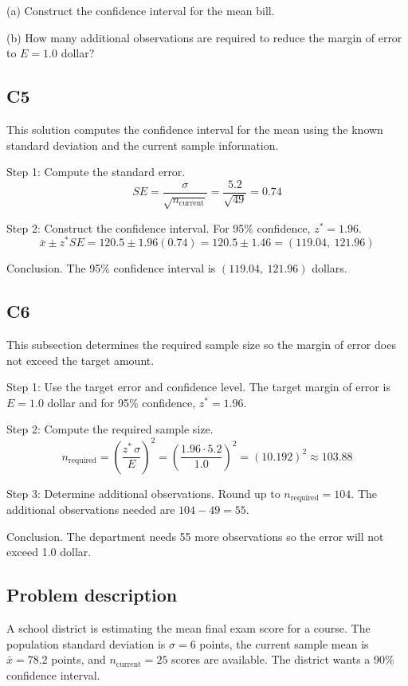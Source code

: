 \begin{ExamProblems}
		(a) Construct the confidence interval for the mean bill.
		
		(b) How many additional observations are required to reduce the margin of error to $E = 1.0$ dollar?
		
		\subsection*{C5}
		This solution computes the confidence interval for the mean using the known standard deviation and the current sample information.
		
		Step 1: Compute the standard error.
		\[
		SE = \frac{\sigma}{\sqrt{n_{\text{current}}}}
		= \frac{5.2}{\sqrt{49}}
		= 0.74
		\]
		
		Step 2: Construct the confidence interval. For 95\% confidence, $z^* = 1.96$.
		\[
		\bar{x} \pm z^* SE = 120.5 \pm 1.96(0.74)
		= 120.5 \pm 1.46
		= (119.04,\ 121.96)
		\]
		
		Conclusion. The 95\% confidence interval is $(119.04,\ 121.96)$ dollars.
		
		\subsection*{C6}
		This subsection determines the required sample size so the margin of error does not exceed the target amount.
		
		Step 1: Use the target error and confidence level. The target margin of error is $E = 1.0$ dollar and for 95\% confidence, $z^* = 1.96$.
		
		Step 2: Compute the required sample size.
		\[
		n_{\text{required}} = \left(\frac{z^*\,\sigma}{E}\right)^2
		= \left(\frac{1.96 \cdot 5.2}{1.0}\right)^2
		= \left(10.192\right)^2
		\approx 103.88
		\]
		
		Step 3: Determine additional observations. Round up to $n_{\text{required}} = 104$. The additional observations needed are $104 - 49 = 55$.
		
		Conclusion. The department needs 55 more observations so the error will not exceed 1.0 dollar.
		
		\item
		\subsection*{Problem description}
		A school district is estimating the mean final exam score for a course. The population standard deviation is $\sigma = 6$ points, the current sample mean is $\bar{x} = 78.2$ points, and $n_{\text{current}} = 25$ scores are available. The district wants a 90\% confidence interval.
		

\end{ExamProblems}
